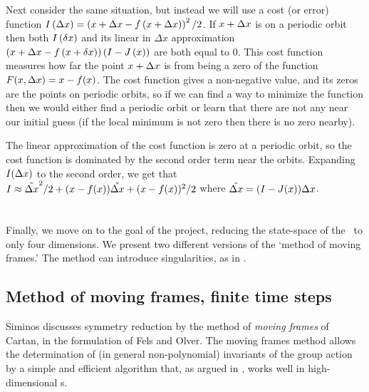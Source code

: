 {Next consider the same situation, but instead we will use a
cost (or error) function $I\left(\Delta x\right) =
\left(x + \Delta x - f\left(x + \Delta
x\right)\right)^2/2$. If $x+\Delta x$ is on a
periodic orbit then both $I\left(\delta x\right)$ and its
linear in $\Delta x$ approximation  $\left(x + \Delta x
- f\left(x+ \delta
x\right)\right)\left(I-J\left(x\right)\right)$ are
both equal to 0. This cost function measures how
far the point $x+ \Delta x$ is from being a zero of the
function $F(x, \Delta x) = x - f(x)$. The cost
function gives a non-negative value, and its zeros are the
points on periodic orbits, so if we can find a way to
minimize the function then we would either find a periodic
orbit or learn that there are not any near our initial guess
(if the local minimum is not zero then there is no zero
nearby).

The linear approximation of the cost function is zero at a
periodic orbit, so the cost function is dominated by the
second order term near the orbits. Expanding $I(\Delta x)$
to the second order, we get that $I \approx \tilde{\Delta
x}^2/2 + (x - f(x)) \tilde{\Delta x} +
(x-f(x))^2/2$ where $\tilde{\Delta x} =
(I-J(x))\Delta x$.

\section{\Reducedsp}
\label{sect:reducedStateSp}

Finally, we move on to the goal of the project, reducing the
state-space of the \cLe\ to only four dimensions. We present
two different versions of the `method of moving frames.' The
method can introduce singularities, as in
.

\subsection{Method of moving frames, finite time steps}
\label{sect:MovFrame}


Siminos discusses symmetry reduction by the
method of {\em moving frames} of Cartan, in the
formulation of Fels and
Olver.
The moving frames method allows the determination of (in
general non-polynomial) invariants of the group action by a
simple and efficient algorithm that, as argued in
, works well in high-dimensional \statesp s.

}
